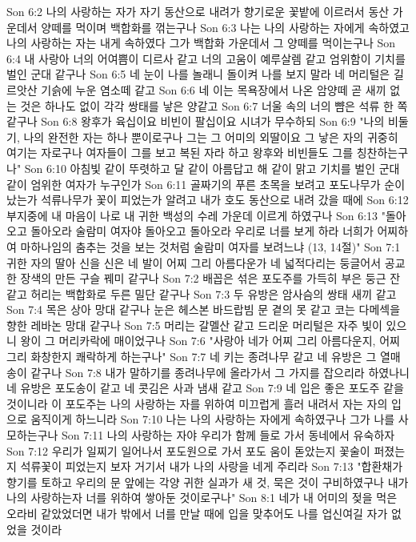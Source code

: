 Son 6:2  나의 사랑하는 자가 자기 동산으로 내려가 향기로운 꽃밭에 이르러서 동산 가운데서 양떼를 먹이며 백합화를 꺾는구나
Son 6:3  나는 나의 사랑하는 자에게 속하였고 나의 사랑하는 자는 내게 속하였다 그가 백합화 가운데서 그 양떼를 먹이는구나
Son 6:4  내 사랑아 너의 어여쁨이 디르사 같고 너의 고움이 예루살렘 같고 엄위함이 기치를 벌인 군대 같구나
Son 6:5  네 눈이 나를 놀래니 돌이켜 나를 보지 말라 네 머리털은 길르앗산 기슭에 누운 염소떼 같고
Son 6:6  네 이는 목욕장에서 나온 암양떼 곧 새끼 없는 것은 하나도 없이 각각 쌍태를 낳은 양같고
Son 6:7  너울 속의 너의 뺨은 석류 한 쪽 같구나
Son 6:8  왕후가 육십이요 비빈이 팔십이요 시녀가 무수하되
Son 6:9  "나의 비둘기, 나의 완전한 자는 하나 뿐이로구나 그는 그 어미의 외딸이요 그 낳은 자의 귀중히 여기는 자로구나 여자들이 그를 보고 복된 자라 하고 왕후와 비빈들도 그를 칭찬하는구나"
Son 6:10  아침빛 같이 뚜렷하고 달 같이 아름답고 해 같이 맑고 기치를 벌인 군대 같이 엄위한 여자가 누구인가
Son 6:11  골짜기의 푸른 초목을 보려고 포도나무가 순이 났는가 석류나무가 꽃이 피었는가 알려고 내가 호도 동산으로 내려 갔을 때에
Son 6:12  부지중에 내 마음이 나로 내 귀한 백성의 수레 가운데 이르게 하였구나
Son 6:13  "돌아오고 돌아오라 술람미 여자야 돌아오고 돌아오라 우리로 너를 보게 하라 너희가 어찌하여 마하나임의 춤추는 것을 보는 것처럼 술람미 여자를 보려느냐 (13, 14절)"
Son 7:1  귀한 자의 딸아 신을 신은 네 발이 어찌 그리 아름다운가 네 넓적다리는 둥글어서 공교한 장색의 만든 구슬 꿰미 같구나
Son 7:2  배꼽은 섞은 포도주를 가득히 부은 둥근 잔 같고 허리는 백합화로 두른 밀단 같구나
Son 7:3  두 유방은 암사슴의 쌍태 새끼 같고
Son 7:4  목은 상아 망대 같구나 눈은 헤스본 바드랍빔 문 곁의 못 같고 코는 다메섹을 향한 레바논 망대 같구나
Son 7:5  머리는 갈멜산 같고 드리운 머리털은 자주 빛이 있으니 왕이 그 머리카락에 매이었구나
Son 7:6  "사랑아 네가 어찌 그리 아름다운지, 어찌 그리 화창한지 쾌락하게 하는구나"
Son 7:7  네 키는 종려나무 같고 네 유방은 그 열매 송이 같구나
Son 7:8  내가 말하기를 종려나무에 올라가서 그 가지를 잡으리라 하였나니 네 유방은 포도송이 같고 네 콧김은 사과 냄새 같고
Son 7:9  네 입은 좋은 포도주 같을 것이니라 이 포도주는 나의 사랑하는 자를 위하여 미끄럽게 흘러 내려서 자는 자의 입으로 움직이게 하느니라
Son 7:10  나는 나의 사랑하는 자에게 속하였구나 그가 나를 사모하는구나
Son 7:11  나의 사랑하는 자야 우리가 함께 들로 가서 동네에서 유숙하자
Son 7:12  우리가 일찌기 일어나서 포도원으로 가서 포도 움이 돋았는지 꽃술이 퍼졌는지 석류꽃이 피었는지 보자 거기서 내가 나의 사랑을 네게 주리라
Son 7:13  "합환채가 향기를 토하고 우리의 문 앞에는 각양 귀한 실과가 새 것, 묵은 것이 구비하였구나 내가 나의 사랑하는자 너를 위하여 쌓아둔 것이로구나"
Son 8:1  네가 내 어미의 젖을 먹은 오라비 같았었더면 내가 밖에서 너를 만날 때에 입을 맞추어도 나를 업신여길 자가 없었을 것이라

